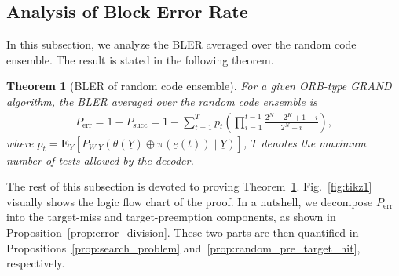 \documentclass[letterpaper,draftclsnofoot,onecolumn]{IEEEtran}
\newtheorem{theorem}{Theorem}%
\begin{document}
\subsection{Analysis of Block Error Rate}\label{SubSec:random_error_rate}

In this subsection, we analyze the BLER averaged over the random code ensemble. The result is stated in the following theorem.

\begin{theorem}[BLER of random code ensemble]\label{th:random_error_rate}
    For a given ORB-type GRAND algorithm, the BLER averaged over the random code ensemble is
    \begin{align}\label{eq:random_bler_main}
        P_{\text{err}} = 1 - P_{\text{succ}} = 1 - \sum_{t=1}^{T}p_t\left(\prod_{i=1}^{t-1}\frac{2^N-2^K+1-i}{2^N-i}\right),
    \end{align}
    where $p_t = \mathbf{E}_{\underline{Y}} \left[P_{\underline{W}|\underline{Y}}(\theta(\underline{Y})\oplus \pi(\underline{e}(t)) \mid \underline{Y})\right]$, $T$ denotes the maximum number of tests allowed by the decoder.
\end{theorem}

The rest of this subsection is devoted to proving Theorem~\ref{th:random_error_rate}. Fig.~\ref{fig:tikz1} visually shows the logic flow chart of the proof. In a nutshell, we decompose $P_{\text{err}}$ into the target-miss and target-preemption components, as shown in Proposition~\ref{prop:error_division}. These two parts are then quantified in Propositions~\ref{prop:search_problem} and~\ref{prop:random_pre_target_hit}, respectively.
\end{document}
